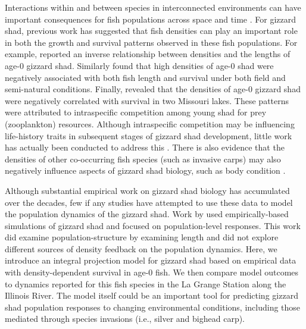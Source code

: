 \documentclass[preprint,review,12pt,authoryear]{elsarticle}
\begin{document}
Interactions within and between species in interconnected environments can have important consequences for fish populations across space and time \citep{thorp2006riverine}.  
For gizzard shad, previous work has suggested that fish densities can play an important role in both the growth and survival patterns observed in these fish populations.  
For example, \citep{buynak1992differential} reported an inverse relationship between densities and the lengths of age-0 gizzard shad.  Similarly \citep{welker1994growth} found that high densities of age-0 shad were negatively associated with both fish length and survival under both field and semi-natural conditions. Finally, \citep{michaletz2010overwinter} revealed that the densities of age-0 gizzard shad were negatively correlated with survival in two Missouri lakes.  
These patterns were attributed to intraspecific competition among young shad for prey (zooplankton) resources. Although intraspecific competition may be influencing life-history traits in subsequent stages of gizzard shad development, little work has actually been conducted to address this \citep{dicenzo1996relations}. 
There is also evidence that the densities of other co-occurring fish species (such as invasive carps) may also negatively influence aspects of gizzard shad biology, such as body condition \citep{irons2007reduced,love2018does}.

Although substantial empirical work on gizzard shad biology has accumulated over the decades, few if any studies have attempted to use these data to model the population dynamics of the gizzard shad.
Work by \citet{catalano2010size, catalano2011whole} used empirically-based simulations of gizzard shad and focused on population-level responses.
This work did examine population-structure by examining length and did
not explore different sources of density feedback on the population
dynamics.
Here, we introduce an integral projection model for gizzard shad based on empirical data with density-dependent survival in age-0 fish.
We then compare model outcomes to dynamics reported for this fish species in the La Grange Station along the Illinois River.
The model itself could be an important tool for predicting gizzard shad population responses to changing environmental conditions, including those mediated through species invasions (i.e., silver and bighead carp).
\end{document}
